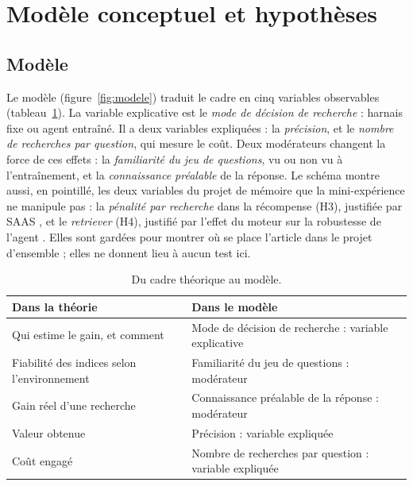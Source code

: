 \section{Modèle conceptuel et hypothèses}\label{sec:hyp}

\subsection{Modèle}
Le modèle (figure~\ref{fig:modele}) traduit le cadre en cinq variables observables (tableau~\ref{tab:passage}). La variable explicative est le \emph{mode de décision de recherche} : harnais fixe ou agent entraîné. Il a deux variables expliquées : la \emph{précision}, et le \emph{nombre de recherches par question}, qui mesure le coût. Deux modérateurs changent la force de ces effets : la \emph{familiarité du jeu de questions}, vu ou non vu à l'entraînement, et la \emph{connaissance préalable} de la réponse. Le schéma montre aussi, en pointillé, les deux variables du projet de mémoire que la mini-expérience ne manipule pas : la \emph{pénalité par recherche} dans la récompense (H3), justifiée par SAAS \citep{tang2026saas}, et le \emph{retriever} (H4), justifié par l'effet du moteur sur la robustesse de l'agent \citep{jin2025empirical}. Elles sont gardées pour montrer où se place l'article dans le projet d'ensemble ; elles ne donnent lieu à aucun test ici.

\begin{table}[ht]
\centering\small
\begin{tabular}{@{}p{5.6cm}p{7.4cm}@{}}
\toprule
Dans la théorie & Dans le modèle\\
\midrule
Qui estime le gain, et comment & Mode de décision de recherche : variable explicative\\
Fiabilité des indices selon l'environnement & Familiarité du jeu de questions : modérateur\\
Gain réel d'une recherche & Connaissance préalable de la réponse : modérateur\\
Valeur obtenue & Précision : variable expliquée\\
Coût engagé & Nombre de recherches par question : variable expliquée\\
\bottomrule
\end{tabular}
\caption{Du cadre théorique au modèle.}
\label{tab:passage}
\end{table}


